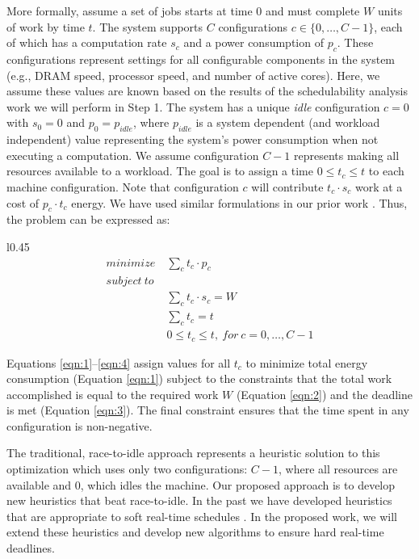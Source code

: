 More formally, assume a set of jobs starts at time $0$ and must
complete $W$ units of work by time $t$. The system supports $C$
configurations $c \in \{0,\dots,C-1\}$, each of which has a
computation rate $s_c$ and a power consumption of $p_c$. These
configurations represent settings for all configurable components in
the system (e.g., DRAM speed, processor speed, and number of active
cores).  Here, we assume these values are known based on the results
of the schedulability analysis work we will perform in Step 1. The
system has a unique \emph{idle} configuration $c = 0$ with $s_0 = 0$
and $p_0 = p_{idle}$, where $p_{idle}$ is a system dependent (and
workload independent) value representing the system's power
consumption when not executing a computation. We assume configuration
$C-1$ represents making all resources available to a workload.  The
goal is to assign a time $0 \le t_c \le t$ to each machine
configuration.  Note that configuration $c$ will contribute $t_c \cdot
s_c$ work at a cost of $p_c \cdot t_c$ energy.  We have used similar
formulations in our prior work \cite{LEO,POET,kim-cpsna}. Thus, the
problem can be
expressed as:

\begin{wrapfigure}{l}{0.45\textwidth}
\begin{align*}
minimize~& \sum_c t_c \cdot p_c \tag{1} \label{eqn:1}\\
subject~to~\\
& \sum_c t_c \cdot s_c = W \tag{2} \label{eqn:2}\\
& \sum_c t_c = t \tag{3} \label{eqn:3}\\
& 0 \le t_c \le t,~for~c = 0,\dots,C-1 \tag{4} \label{eqn:4}
\end{align*}
\end{wrapfigure}

Equations \ref{eqn:1}--\ref{eqn:4} assign values for all $t_c$ to
minimize total energy consumption (Equation \ref{eqn:1}) subject to the
constraints that the total work accomplished is equal to the required
work $W$ (Equation \ref{eqn:2}) and the deadline is met (Equation
\ref{eqn:3}). The final constraint ensures that the time spent in any
configuration is non-negative.

The traditional, race-to-idle approach represents a heuristic solution
to this optimization which uses only two configurations: $C-1$, where
all resources are available and $0$, which idles the machine.  Our
proposed approach is to develop new heuristics that beat race-to-idle.
In the past we have developed heuristics that are appropriate to soft
real-time schedules \cite{POET,PTRADE}.  In the proposed work, we will
extend these heuristics and develop new algorithms to ensure hard
real-time deadlines.  

